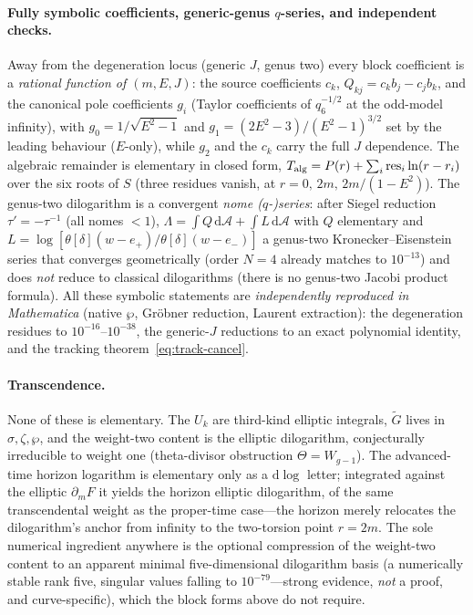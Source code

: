 \documentclass[12pt]{iopart}
\newcommand{\dd}{\mathrm{d}}
\theoremstyle{plain}
\theoremstyle{definition}
\theoremstyle{plain}
\theoremstyle{remark}
\begin{document}
\paragraph{Fully symbolic coefficients, generic-genus $q$-series, and independent checks.}
Away from the degeneration locus (generic $J$, genus two) every block coefficient is a
\emph{rational function of $(m,E,J)$}: the source coefficients $c_k$,
$Q_{kj}=c_kb_j-c_jb_k$, and the canonical pole coefficients $g_i$ (Taylor
coefficients of $q_6^{-1/2}$ at the odd-model infinity), with
$g_0=1/\sqrt{E^2-1}$ and $g_1=(2E^2-3)/(E^2-1)^{3/2}$ set by the leading behaviour
($E$-only), while $g_2$ and the $c_k$ carry the full $J$ dependence. The
algebraic remainder is elementary in closed form,
$T_{\rm alg}=P(r)+\sum_i\mathrm{res}_i\ln(r-r_i)$ over the six roots of $S$
(three residues vanish, at $r=0,\,2m,\,2m/(1-E^2)$). The genus-two dilogarithm is a
convergent \emph{nome ($q$-)series}: after Siegel reduction $\tau'=-\tau^{-1}$ (all
nomes ${<}1$), $\Lambda=\int Q\,\dd\mathcal A+\int L\,\dd\mathcal A$ with $Q$
elementary and $L=\log[\theta[\delta](w-e_+)/\theta[\delta](w-e_-)]$ a genus-two
Kronecker--Eisenstein series that converges geometrically (order $N{=}4$ already
matches to $10^{-13}$) and does \emph{not} reduce to classical dilogarithms (there is
no genus-two Jacobi product formula). All these symbolic statements are
\emph{independently reproduced in Mathematica} (native $\wp$, Gröbner reduction,
Laurent extraction): the degeneration residues to $10^{-16}$--$10^{-38}$, the generic-$J$
reductions to an exact polynomial identity, and the tracking
theorem~\eqref{eq:track-cancel}.

\paragraph{Transcendence.}
None of these is elementary. The $U_k$ are third-kind elliptic integrals, $\tilde G$
lives in $\sigma,\zeta,\wp$, and the weight-two content is the elliptic dilogarithm,
conjecturally irreducible to weight one (theta-divisor obstruction $\Theta=W_{g-1}$). The
advanced-time horizon logarithm is elementary only as a $\dd\log$ letter; integrated
against the elliptic $\partial_m F$ it yields the horizon elliptic dilogarithm, of the
same transcendental weight as the proper-time case---the horizon merely relocates the
dilogarithm's anchor from infinity to the two-torsion point $r=2m$. The sole
numerical ingredient anywhere is the optional compression of the weight-two content to
an apparent minimal five-dimensional dilogarithm basis (a numerically stable rank five,
singular values falling to $10^{-79}$---strong evidence, \emph{not} a proof, and
curve-specific), which the block forms above do not require.
\end{document}

